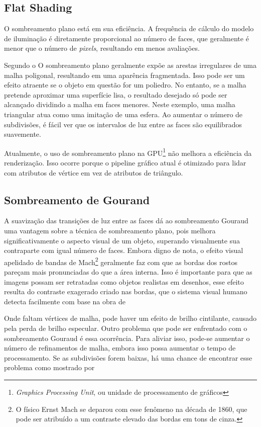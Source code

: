 \subsection{Flat Shading}

O sombreamento plano está em sua eficiência. A frequência de cálculo do modelo de iluminação é diretamente proporcional ao número de faces, que geralmente é menor que o número de \textit{pixels}, resultando em menos avaliações.

Segundo o  O sombreamento plano geralmente expõe as arestas irregulares de uma malha poligonal, resultando em uma aparência fragmentada. Isso pode ser um efeito atraente se o objeto em questão for um poliedro. No entanto, se a malha pretende aproximar uma superfície lisa, o resultado desejado só pode ser alcançado dividindo a malha em faces menores. Neste exemplo, uma malha triangular atua como uma imitação de uma esfera. Ao aumentar o número de subdivisões, é fácil ver que os intervalos de luz entre as faces são equilibrados suavemente.

Atualmente, o uso de sombreamento plano na GPU\footnote{\textit{Graphics Processing Unit}, ou unidade de processamento de gráficos} não melhora a eficiência da renderização. Isso ocorre porque o pipeline gráfico atual é otimizado para lidar com atributos de vértice em vez de atributos de triângulo.

\subsection{Sombreamento de Gourand}

A suavização das transições de luz entre as faces dá ao sombreamento Gouraud uma vantagem sobre a técnica de sombreamento plano, pois melhora significativamente o aspecto visual de um objeto, superando visualmente sua contraparte com igual número de faces.  Embora digno de nota, o efeito visual apelidado de bandas de Mach\footnote{O físico Ernst Mach se deparou com esse fenômeno na década de 1860, que pode ser atribuído a um contraste elevado das bordas em tons de cinza.} geralmente faz com que as bordas dos rostos pareçam mais pronunciadas do que a área interna. Isso é importante para que as imagens possam ser retratadas como objetos realistas em desenhos, esse efeito resulta do contraste exagerado criado nas bordas, que o sistema visual humano detecta facilmente com base na obra de 

Onde faltam vértices de malha, pode haver um efeito de brilho cintilante, causado pela perda de brilho especular.  Outro problema que pode ser enfrentado com o sombreamento Gouraud é essa ocorrência.  Para aliviar isso, pode-se aumentar o número de refinamentos de malha, embora isso possa aumentar o tempo de processamento.  Se as subdivisões forem baixas, há uma chance de encontrar esse problema como mostrado por 

